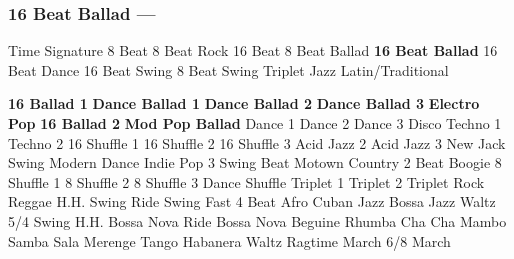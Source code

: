 \subsubsection[16 Beat Ballad]{16 Beat Ballad --- \UiKey{\II}\UiKey{\MET}}
Time Signature
8 Beat
8 Beat Rock
16 Beat
8 Beat Ballad
\textbf{16 Beat Ballad}
16 Beat Dance
16 Beat Swing
8 Beat Swing
Triplet
Jazz
Latin/Traditional





























\textbf{16 Ballad 1}
\textbf{Dance Ballad 1}
\textbf{Dance Ballad 2}
\textbf{Dance Ballad 3}
\textbf{Electro Pop}
\textbf{16 Ballad 2}
\textbf{Mod Pop Ballad}
Dance 1
Dance 2
Dance 3
Disco
Techno 1
Techno 2
16 Shuffle 1
16 Shuffle 2
16 Shuffle 3
Acid Jazz 2
Acid Jazz 3
New Jack Swing
Modern Dance
Indie Pop 3
Swing Beat
Motown
Country 2 Beat
Boogie
8 Shuffle 1
8 Shuffle 2
8 Shuffle 3
Dance Shuffle
Triplet 1
Triplet 2
Triplet Rock
Reggae
H.H. Swing
Ride Swing
Fast 4 Beat
Afro Cuban
Jazz Bossa
Jazz Waltz
5/4 Swing
H.H. Bossa Nova
Ride Bossa Nova
Beguine
Rhumba
Cha Cha
Mambo
Samba
Sala
Merenge
Tango
Habanera
Waltz
Ragtime
March
6/8 March
